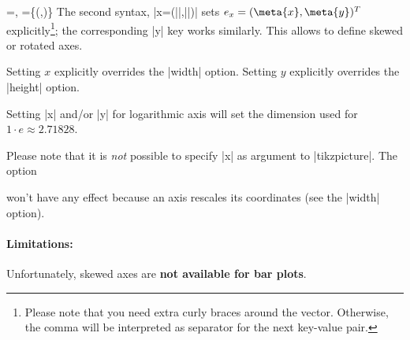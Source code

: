 \begin{pgfplotsxykeylist}{
	\x=,
	\x={\{(,)\}}}
The second syntax, |x={(||,||)}| sets $e_x = (\meta{x},\meta{y})^T$ explicitly\footnote{Please note that you need extra curly braces around the vector. Otherwise, the comma will be interpreted as separator for the next key-value pair.}; the corresponding |y| key works similarly. This allows to define skewed or rotated axes.

\begin{codeexample}[]
\end{codeexample}

\begin{codeexample}[]
\end{codeexample}

	Setting $x$ explicitly overrides the |width| option. Setting $y$ explicitly overrides the |height| option.

	Setting |x| and/or |y| for logarithmic axis will set the dimension used for $1 \cdot e \approx 2.71828$.

	Please note that it is \emph{not} possible to specify |x| as argument to |tikzpicture|. The option 
\begin{codeexample}
\end{codeexample}
	won't have any effect because an axis rescales its coordinates (see the |width| option).

\paragraph{Limitations:} Unfortunately, skewed axes are \textbf{not available for bar plots}.
%
%

\begin{codeexample}[]
\end{codeexample}
\end{pgfplotsxykeylist}

